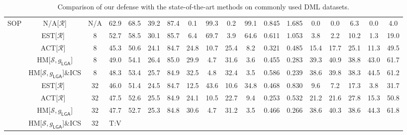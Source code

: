 \begin{table*}
{\begin{tabular}{c|cc|cccc|ccccc|ccccc|c}
\multirow{9}{*}{SOP} & N/A{[}$\mathcal{R}${]} & N/A & 62.9 & 68.5 & 39.2 & 87.4 & 0.1 & 99.3 & 0.2 & 99.1 & 0.845 & 1.685 & 0.0 & 0.0 & 6.3 & 0.0 & 4.0\tabularnewline
\cline{2-18} \cline{3-18} \cline{4-18} \cline{5-18} \cline{6-18} \cline{7-18} \cline{8-18} \cline{9-18} \cline{10-18} \cline{11-18} \cline{12-18} \cline{13-18} \cline{14-18} \cline{15-18} \cline{16-18} \cline{17-18} \cline{18-18} 
 & EST{[}$\mathcal{R}${]}~\cite{advrank} & 8 & 52.7 & 58.5 & 30.1 & 85.7 & 6.4 & 69.7 & 3.9 & 64.6 & 0.611 & 1.053 & 3.8 & 2.2 & 10.2 & 1.3 & 19.0\tabularnewline
 & ACT{[}$\mathcal{R}${]}~\cite{robrank} & 8 & 45.3 & 50.6 & 24.1 & 84.7 & 24.8 & 10.7 & 25.4 & 8.2 & 0.321 & 0.485 & 15.4 & 17.7 & 25.1 & 11.3 & 49.5\tabularnewline
 & HM{[}$\mathcal{S},g_{\mathsf{LGA}}${]} & 8 & 49.0 & 54.1 & 26.4 & 85.0 & 29.9 & 4.7 & 31.6 & 3.6 & 0.455 & 0.283 & 39.3 & 40.9 & 38.8 & 43.0 & 61.7\tabularnewline
 & HM{[}$\mathcal{S},g_{\mathsf{LGA}}${]}\&ICS & 8 & 48.3 & 53.4 & 25.7 & 84.9 & 32.5 & 4.8 & 32.4 & 3.5 & 0.586 & 0.239 & 38.6 & 39.8 & 38.3 & 44.5 & 61.2\tabularnewline
\cline{2-18} \cline{3-18} \cline{4-18} \cline{5-18} \cline{6-18} \cline{7-18} \cline{8-18} \cline{9-18} \cline{10-18} \cline{11-18} \cline{12-18} \cline{13-18} \cline{14-18} \cline{15-18} \cline{16-18} \cline{17-18} \cline{18-18} 
 & EST{[}$\mathcal{R}${]}~\cite{advrank} & 32 & 46.0 & 51.4 & 24.5 & 84.7 & 12.5 & 43.6 & 10.6 & 34.8 & 0.468 & 0.830 & 9.6 & 7.2 & 17.3 & 3.8 & 31.7\tabularnewline
 & ACT{[}$\mathcal{R}${]}~\cite{robrank} & 32 & 47.5 & 52.6 & 25.5 & 84.9 & 24.1 & 10.5 & 22.7 & 9.4 & 0.253 & 0.532 & 21.2 & 21.6 & 27.8 & 15.3 & 50.8\tabularnewline
 & HM{[}$\mathcal{S},g_{\mathsf{LGA}}${]} & 32 & 47.7 & 52.7 & 25.3 & 84.8 & 30.6 & 4.7 & 31.2 & 3.5 & 0.466 & 0.266 & 38.6 & 40.3 & 38.6 & 44.3 & 61.8\tabularnewline
 & HM{[}$\mathcal{S},g_{\mathsf{LGA}}${]}\&ICS & 32 & T:V &  &  &  &  &  &  &  &  &  &  &  &  &  & \tabularnewline

	\bottomrule

\end{tabular}}
	\vspace{-0.5em}
\caption{Comparison of our defense with the state-of-the-art methods on commonly used DML datasets.}
	\label{tab:sota}
\end{table*}
